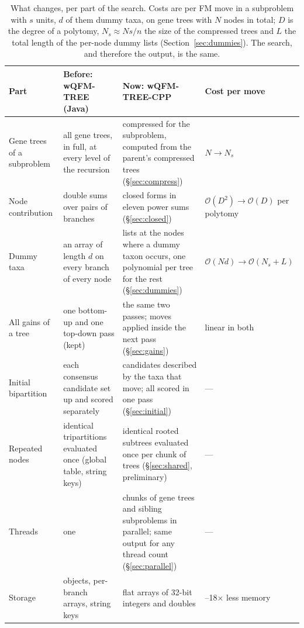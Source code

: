 \documentclass[11pt,a4paper]{article}
\newcommand{\wqfmtree}{wQFM-TREE}
\newcommand{\cpp}{wQFM-TREE-CPP}
\newcommand{\Oh}{\mathcal{O}}
\begin{document}
\begin{table}[t]
\centering\footnotesize
\caption{What changes, per part of the search. Costs are per FM move in a subproblem with $s$ units,
$d$ of them dummy taxa, on gene trees with $N$ nodes in total; $D$ is the degree of a polytomy,
$N_s\approx N s/n$ the size of the compressed trees and $L$ the total length of the per-node dummy
lists (Section~\ref{sec:dummies}). The search, and therefore the output, is the same.}
\label{tab:summary}
\setlength{\tabcolsep}{4pt}
\begin{tabular}{@{}>{\raggedright}p{2.5cm}>{\raggedright}p{4.6cm}>{\raggedright}p{4.6cm}>{\raggedright\arraybackslash}p{2.6cm}@{}}
\toprule
Part & Before: \wqfmtree{} (Java) & Now: \cpp & Cost per move \\
\midrule
Gene trees of a subproblem & all gene trees, in full, at every level of the recursion & compressed for the subproblem, computed from the parent's compressed trees (\S\ref{sec:compress}) & $N \to N_s$ \\ \addlinespace[3pt]
Node contribution & double sums over pairs of branches & closed forms in eleven power sums (\S\ref{sec:closed}) & $\Oh(D^2)\to\Oh(D)$ per polytomy \\ \addlinespace[3pt]
Dummy taxa & an array of length $d$ on every branch of every node & lists at the nodes where a dummy taxon occurs, one polynomial per tree for the rest (\S\ref{sec:dummies}) & $\Oh(Nd)\to\Oh(N_s+L)$ \\ \addlinespace[3pt]
All gains of a tree & one bottom-up and one top-down pass (kept) & the same two passes; moves applied inside the next pass (\S\ref{sec:gains}) & linear in both \\ \addlinespace[3pt]
Initial bipartition & each consensus candidate set up and scored separately & candidates described by the taxa that move; all scored in one pass (\S\ref{sec:initial}) & --- \\ \addlinespace[3pt]
Repeated nodes & identical tripartitions evaluated once (global table, string keys) & identical rooted subtrees evaluated once per chunk of trees (\S\ref{sec:shared}, preliminary) & --- \\ \addlinespace[3pt]
Threads & one & chunks of gene trees and sibling subproblems in parallel; same output for any thread count (\S\ref{sec:parallel}) & --- \\ \addlinespace[3pt]
Storage & objects, per-branch arrays, string keys & flat arrays of 32-bit integers and doubles & 7.6--18$\times$ less memory \\
\bottomrule
\end{tabular}
\end{table}
\end{document}
